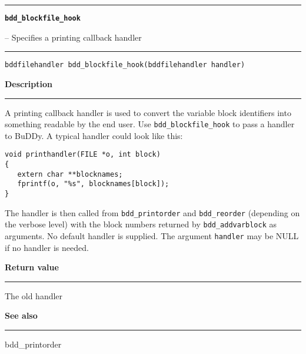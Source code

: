 \begin{minipage}{\textwidth}

\noindent\begin{minipage}{\textwidth}
\rule{\textwidth}{0.5mm}
{\tt\bf bdd\_blockfile\_hook }
\--- Specifies a printing callback handler  \hspace{\fill}
\\\rule[1.5ex]{\textwidth}{0.5mm}
\end{minipage}

\noindent\begin{verbatim}
bddfilehandler bdd_blockfile_hook(bddfilehandler handler) 
\end{verbatim}

\vspace{\parsep}\noindent
{\bf Description}\\\rule[1.5ex]{\textwidth}{0.2mm}\vspace{-1.5ex}\setlength{\parindent}{1em}
A printing callback handler is used to convert the variable
           block identifiers into something readable by the end user. Use
	   {\tt bdd\_blockfile\_hook} to pass a handler to BuDDy. A typical
	   handler could look like this:
\begin{verbatim}
void printhandler(FILE *o, int block)
{
   extern char **blocknames;
   fprintf(o, "%s", blocknames[block]);
}
\end{verbatim}
           \noindent
           The handler is then called from {\tt bdd\_printorder} and
	   {\tt bdd\_reorder} (depending on the verbose level) with
           the block numbers returned by {\tt bdd\_addvarblock} as arguments.
	   No default handler is supplied. The argument {\tt handler} may be
	   NULL if no handler is needed. 

\setlength{\parindent}{0em}\vspace{\parsep}\vspace{\baselineskip}\noindent
{\bf Return value}\\\rule[1.5ex]{\textwidth}{0.2mm}\vspace{-1.5ex}
The old handler 

\vspace{\parsep}\vspace{\baselineskip}\noindent
{\bf See also}\\\rule[1.5ex]{\textwidth}{0.2mm}\vspace{-1.5ex}
bdd\_printorder 
\end{minipage}
